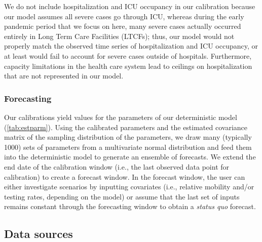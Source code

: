 \documentclass[12pt]{article}\usepackage[]{graphicx}\usepackage[]{color}
\begin{document}
\begin{table}
  \centering
  
  \label{tab:litparm}
\end{table}

We do not include hospitalization and ICU occupancy in our calibration because our model assumes all severe cases go through ICU, whereas during the early pandemic period
that we focus on here, many severe cases actually occurred entirely in Long Term Care Facilities (LTCFs); thus,
our model would not properly match the observed time series of hospitalization and ICU occupancy, or at least would fail to account for
severe cases outside of hospitals. Furthermore, capacity limitations in the health care system lead to ceilings on hospitalization that are
not represented in our model.

\subsubsection*{Forecasting}

Our calibrations yield values for the parameters of our deterministic model (\cref{tab:estparm}).
Using the calibrated parameters and the estimated covariance matrix of the sampling distribution of the parameters, we draw many (typically 1000) sets of parameters from a multivariate normal distribution \cite{Bolk08,krinskyThree1991a} and feed them into the deterministic model to generate an ensemble of forecasts. We extend the end date of the calibration window (i.e., the last observed data point for calibration) to create a forecast window. In the forecast window, the user can either investigate scenarios by inputting covariates (i.e., relative mobility and/or testing rates, depending on the model) or assume that the last set of inputs remains constant through the forecasting window to obtain a
\emph{status quo} forecast.

\subsection{Data sources}
\end{document}
